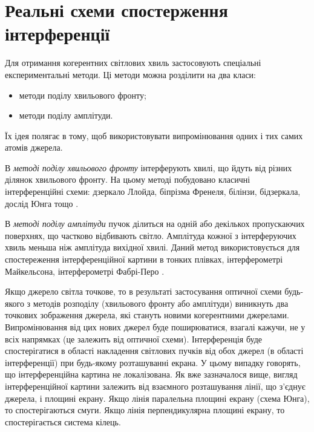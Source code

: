 \section{Реальні схеми спостерження інтерференції}

Для отримання когерентних світлових хвиль застосовують спеціальні експериментальні методи. Ці методи можна розділити на два класи:
\begin{itemize}
	\item методи поділу хвильового фронту;
	\item методи поділу амплітуди.
\end{itemize}

Їх ідея полягає в тому, щоб використовувати випромінювання одних і тих самих атомів джерела.

В \emph{методі поділу хвильового фронту} інтерферують хвилі, що йдуть від різних ділянок хвильового фронту. На цьому методі побудовано класичні інтерференційні схеми: дзеркало Ллойда, біпрізма Френеля, білінзи, бідзеркала, дослід Юнга тощо \cite[\S  5, стор. 81]{Godzhaev}.

В \emph{методі поділу амплітуди} пучок ділиться на одній або декількох пропускаючих поверхнях, що частково відбивають світло. Амплітуда кожної з інтерферуючих хвиль меньша ніж амплітуда вихідної хвилі. Даний метод використовується для спостереження інтерференційної картини в тонких плівках, інтерферометрі Майкельсона, інтерферометрі Фабрі-Перо \cite[\S 6, стор. 85]{Godzhaev}.

Якщо джерело світла точкове, то в результаті застосування оптичної схеми будь-якого з методів розподілу (хвильового фронту або амплітуди) виникнуть два точкових зображення джерела, які стануть новими когерентними джерелами. Випромінювання від цих нових джерел буде поширюватися, взагалі кажучи, не у всіх напрямках (це залежить від
оптичної схеми). Інтерференція буде спостерігатися в області накладення
світлових пучків від обох джерел (в області інтерференції) при будь-якому
розташуванні екрана. У цьому випадку говорять, що інтерференційна картина
не локалізована. Як вже зазначалося вище, вигляд інтерференційної картини
залежить від взаємного розташування лінії, що з'єднує джерела, і
площині екрану. Якщо лінія паралельна площині екрану (схема Юнга), то
спостерігаються смуги. Якщо лінія перпендикулярна площині екрану, то
спостерігається система кілець.